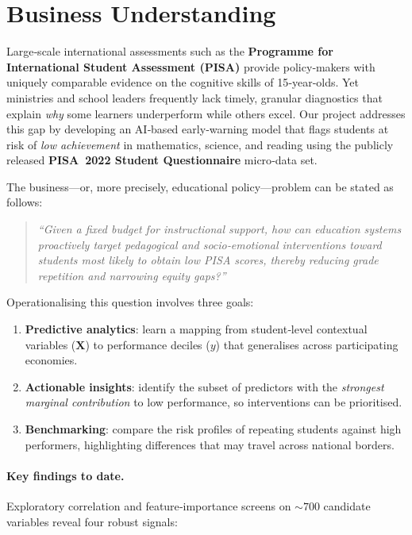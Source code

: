 
\section{Business Understanding}\label{sec:business_understanding}

Large‑scale international assessments such as the \textbf{Programme for International Student Assessment (PISA)} provide policy‑makers with uniquely comparable evidence on the cognitive skills of 15‑year‑olds.  Yet ministries and school leaders frequently lack timely, granular diagnostics that explain \emph{why} some learners underperform while others excel.  Our project addresses this gap by developing an AI‑based early‑warning model that flags students at risk of \textit{low achievement} in mathematics, science, and reading using the publicly released \textbf{PISA 2022 Student Questionnaire} micro‑data set.

The business—or, more precisely, educational policy—problem can be stated as follows:

\begin{quote}
    \emph{“Given a fixed budget for instructional support, how can education systems proactively target pedagogical and socio‑emotional interventions toward students most likely to obtain low PISA scores, thereby reducing grade repetition and narrowing equity gaps?”}
\end{quote}

Operationalising this question involves three goals:

\begin{enumerate}
    \item \textbf{Predictive analytics}: learn a mapping from student‑level contextual variables ($\mathbf{X}$) to performance deciles ($y$) that generalises across participating economies.
    \item \textbf{Actionable insights}: identify the subset of predictors with the \emph{strongest marginal contribution} to low performance, so interventions can be prioritised.
    \item \textbf{Benchmarking}: compare the risk profiles of repeating students against high performers, highlighting differences that may travel across national borders.
\end{enumerate}

\paragraph{Key findings to date.}
Exploratory correlation and feature‑importance screens on $\sim700$ candidate variables reveal four robust signals:

